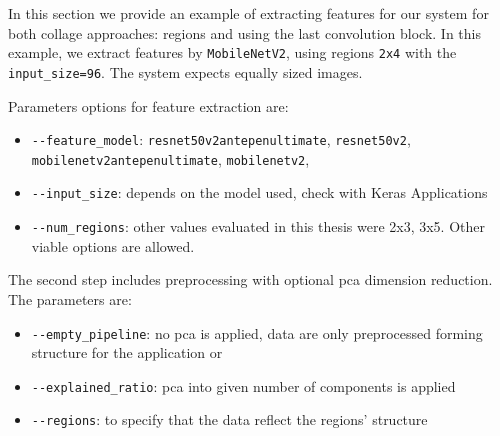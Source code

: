In this section we provide an example of extracting features for our system for both collage approaches: regions and using the last convolution block. In this example, we extract features by \verb+MobileNetV2+, using regions \verb+2x4+ with the \verb+input_size=96+. The system expects equally sized images.

\vspace{0.5cm}

\vspace{0.5cm}

Parameters options for feature extraction are:
\begin{itemize}
    \item \verb+--feature_model+: \verb+resnet50v2antepenultimate+, \verb+resnet50v2+, \\ \verb+mobilenetv2antepenultimate+, \verb+mobilenetv2+, 
    \item \verb+--input_size+: depends on the model used, check with Keras Applications
    \item \verb+--num_regions+: other values evaluated in this thesis were 2x3, 3x5. Other viable options are allowed.
\end{itemize}

The second step includes preprocessing with optional \acrshort{pca} dimension reduction. The parameters are:
\begin{itemize}
    \item \verb+--empty_pipeline+: no \acrshort{pca} is applied, data are only preprocessed forming structure for the application or
    \item \verb+--explained_ratio+: \acrshort{pca} into given number of components is applied
    \item \verb+--regions+: to specify that the data reflect the regions' structure
\end{itemize}

